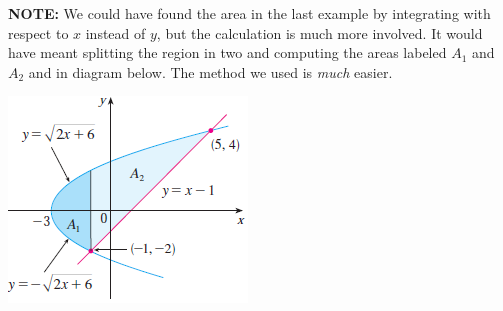 \begin{frame}
\textbf{NOTE:} We could have found the area in the last example by integrating with respect to $ x $ instead of $ y $, but the calculation is much more involved. It would have meant splitting the region in two and computing the areas labeled $ A_1 $ and $ A_2 $ and in diagram below. The method we used is \textit{much} easier.\\
\begin{center}
\includegraphics[width=0.5\linewidth]{../../modules/area-between-curves/pictures/H4.PNG}
\end{center}

\end{frame}
